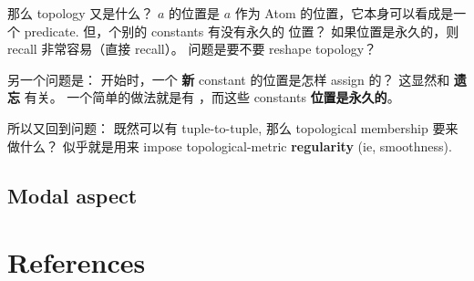 那么 topology 又是什么？  $a$ 的位置是 $a$ 作为 Atom 的位置，它本身可以看成是一个 predicate.  但，个别的 constants 有没有永久的 位置？  如果位置是永久的，则 recall 非常容易（直接 recall）。 问题是要不要 reshape topology？  

另一个问题是： 开始时，一个 \textbf{新} constant 的位置是怎样 assign 的？  这显然和 \textbf{遗忘} 有关。  一个简单的做法就是有 ，而这些 constants \textbf{位置是永久的}。

所以又回到问题： 既然可以有 tuple-to-tuple, 那么 topological membership 要来做什么？  似乎就是用来 impose topological-metric \textbf{regularity} (ie, smoothness).

\subsection{Modal aspect}

\section*{References}
 \smiley \\ \vspace*{0.4cm}
\printbibliography

 
